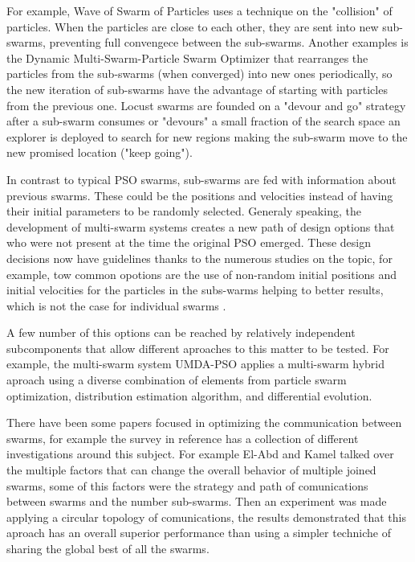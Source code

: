 \documentclass[runningheads]{llncs}
\begin{document}
For example, Wave of Swarm of Particles \cite{b6} uses a technique on
the "collision" of particles. %
When the
particles are close to each other, they are sent into new sub-swarms,
preventing full convengece between the sub-swarms. Another examples is the Dynamic Multi-Swarm-Particle
Swarm Optimizer\cite{b7} that rearranges the particles from the sub-swarms
(when converged) into new ones periodically, so the new
iteration of sub-swarms have the advantage of starting with particles from the previous
one. Locust swarms \cite{b8} are founded on a "devour and go" strategy
after a sub-swarm consumes or "devours" a small fraction of the search space an explorer is deployed to search for
new regions making the sub-swarm move to the new promised location ("keep going").

In contrast to typical PSO swarms, sub-swarms are fed with information about
previous swarms. %
These could be the positions and velocities instead of having
their initial parameters to be randomly selected. Generaly speaking, the development of
multi-swarm systems creates a new path of design options that who were not present at the time the original PSO emerged. 
These design decisions now have guidelines thanks to the numerous studies on the topic, for
example, tow common opotions are the use of non-random initial positions and initial velocities for the particles in the subs-warms helping to
better results, which is not the case for individual swarms \cite{b9}.

A few number of this options can be reached by relatively independent
subcomponents that allow different aproaches to this matter to be
tested. For example, the multi-swarm system UMDA-PSO \cite{b10} 
applies a multi-swarm hybrid aproach using a diverse combination of 
elements from particle swarm optimization, distribution estimation 
algorithm, and differential evolution.

There have been some papers focused in optimizing the communication
between swarms, for example the survey in reference \cite{b15} has a
collection of different investigations around this subject. For
example El-Abd and Kamel talked over the multiple factors that can
change the overall behavior of multiple joined swarms, some of this factors
were the strategy and path of comunications between swarms and the number sub-swarms. 
Then an experiment was made applying a circular topology of comunications, 
the results demonstrated that this aproach has an overall superior performance 
than using a simpler techniche of sharing the global best of all the swarms\cite{b16}. 
\end{document}
